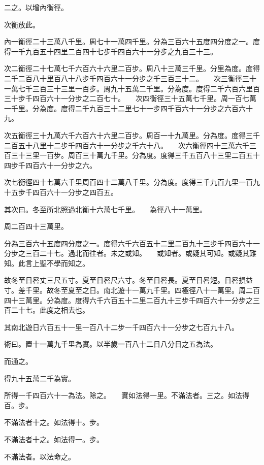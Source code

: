 \documentclass[a4paper,12pt,UTF8,twoside]{ctexbook}
\begin{document}
二之。以增內衡徑。

次衡放此。

內一衡徑二十三萬八千里。周七十一萬四千里。分為三百六十五度四分度之一。度得一千九百五十四里二百四十七步千四百六十一分步之九百三十三。

次二衡徑二十七萬七千六百六十六里二百步。周八十三萬三千里。分里為度。度得二千二百八十里百八十八步千四百六十一分步之千三百三十二。　　次三衡徑三十一萬七千三百三十三里一百步。周九十五萬二千里。分為度。度得二千六百六里百三十步千四百六十一分步之二百七十。　　次四衡徑三十五萬七千里。周一百七萬一千里。分為度。度得二千九百三十二里七十一步四千百六十一分步之六百六十九。

次五衡徑三十九萬六千六百六十六里二百步。周百一十九萬里。分為度。度得三千二百五十八里十二步千四百六十一分步之千六十八。　　次六衡徑四十三萬六千三百三十三里一百步。周百三十萬九千里。分為度。度得三千五百八十三里二百五十四步千四百六十一分步之六。

次七衡徑四十七萬六千里周百四十二萬八千里。分為度。度得三千九百九里一百九十五步千四百六十一分步之四百五。

其次曰。冬至所北照過北衡十六萬七千里。　　為徑八十一萬里。

周二百四十三萬里。

分為三百六十五度四分度之一。度得六千六百五十二里二百九十三步千四百六十一分步之三百二十七。過北而往者。未之或知。　　或知者。或疑其可知。或疑其難知。此言上聖不學而知之。

故冬至日晷丈三尺五寸。夏至日晷尺六寸。冬至日晷長。夏至日晷短。日晷損益寸。差千里。故冬至夏至之日。南北遊十一萬九千里。四極徑八十一萬里。周二百四十三萬里。分為度。度得六千六百五十二里二百九十三步千四百六十一分步之三百二十七。此度之相去也。

其南北遊日六百五十一里一百八十二步一千四百六十一分步之七百九十八。

術曰。置十一萬九千里為實。以半歲一百八十二日八分日之五為法。

而通之。

得九十五萬二千為實。

所得一千四百六十一為法。除之。　　實如法得一里。不滿法者。三之。如法得百。步。

不滿法者十之。如法得十。步。

不滿法者十之。如法得一。步。

不滿法者。以法命之。

\part{}
\end{document}
